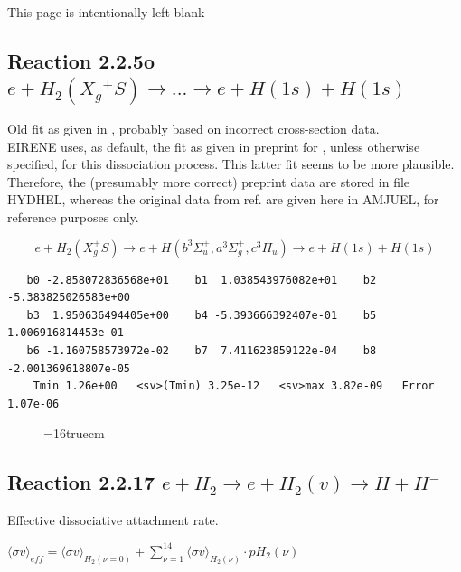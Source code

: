 \documentclass[12pt,dvips]{article}
\begin{document}
\newpage
This page is intentionally left blank
\newpage


\subsection{
Reaction 2.2.5o
$e + H_2(X_g\!^+ S ) \rightarrow . . .\rightarrow e + H(1s) + H(1s)$}


Old fit as given in \cite{kn:Janev}, probably based on incorrect cross-section data.\\
      EIRENE uses, as default, the fit as given in preprint for \cite{kn:Janev},
      unless otherwise specified, for this dissociation process.
      This latter fit seems to be more plausible. Therefore, the
      (presumably more correct) preprint data are stored in file HYDHEL,
      whereas the original data from ref.\cite{kn:Janev} are given here in AMJUEL,
      for reference purposes only.



\begin{displaymath}
 e + H_2 (X_g^+ S ) \rightarrow e + H (b^3\Sigma^+_u , a^3\Sigma^+_g,
c^3\Pi_u)
             \rightarrow e + H(1s) + H(1s)
\end{displaymath}



\begin{small}\begin{verbatim}
   b0 -2.858072836568e+01    b1  1.038543976082e+01    b2 -5.383825026583e+00
   b3  1.950636494405e+00    b4 -5.393666392407e-01    b5  1.006916814453e-01
   b6 -1.160758573972e-02    b7  7.411623859122e-04    b8 -2.001369618807e-05
    Tmin 1.26e+00   <sv>(Tmin) 3.25e-12   <sv>max 3.82e-09   Error 1.07e-06
\end{verbatim}\end{small}
\begin{figure} \label{2.2.5.or}
\epsfxsize=16truecm
\end{figure}

 \newpage

\subsection{
Reaction 2.2.17  $e + H_2 \rightarrow e + H_2(v) \rightarrow H + H^-$
}
Effective dissociative attachment rate.

$ \langle\sigma v \rangle_{eff} = \langle\sigma v \rangle_{H_2(\nu=0)} + \sum_{\nu=1}^{14}
\langle\sigma v \rangle_{H_2(\nu)} \cdot pH_2(\nu) $
\end{document}
